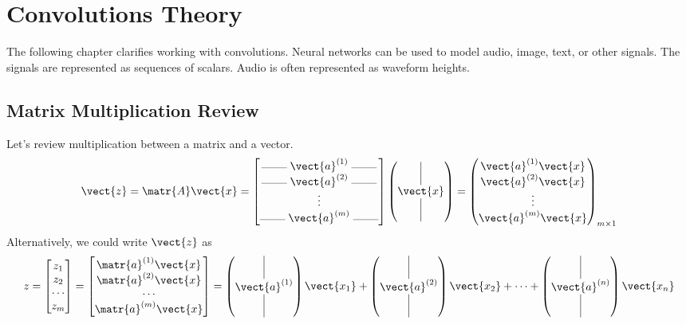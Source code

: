 \chapter{Convolutions Theory}
The following chapter clarifies working with convolutions.
Neural networks can be used to model audio, image, text, or other signals. The signals are represented as sequences of scalars. Audio is often represented as waveform heights. 
\section{Matrix Multiplication Review}
Let's review multiplication between a matrix and a vector.
\[
\vect{z} = {\matr{A}}\vect{x} =
\begin{bmatrix}
    \rule[0.5mm]{0.8cm}{0.1mm} \; {\vect{a}}^{(1)} \; \rule[0.5mm]{0.8cm}{0.1mm} \\
    \rule[0.5mm]{0.8cm}{0.1mm} \; {\vect{a}}^{(2)} \; \rule[0.5mm]{0.8cm}{0.1mm} \\
    \vdots \\
    \rule[0.5mm]{0.8cm}{0.1mm} \; {\vect{a}}^{(m)} \; \rule[0.5mm]{0.8cm}{0.1mm} \\
\end{bmatrix}
\begin{pmatrix}
    \vrule height 0.6cm \\ \vect{x} \\ \vrule height 0.6cm
\end{pmatrix} =
\begin{pmatrix}
    {\vect{a}}^{(1)} \vect{x} \\ {\vect{a}}^{(2)} \vect{x} \\ \vdots \\ {\vect{a}}^{(m)} \vect{x}
\end{pmatrix}_{m \times 1}
\]
Alternatively, we could write $\vect{z}$ as 
\[z = \begin{bmatrix} z_1 \\ z_2 \\ \cdots \\z_m\end{bmatrix} = \begin{bmatrix} \matr{a}^{(1)}\vect{x} \\ \matr{a}^{(2)}\vect{x} \\\cdots \\\matr{a}^{(m)}\vect{x}\end{bmatrix}
= \begin{pmatrix}
    \vrule height 0.6cm \\ \vect{a}^{(1)} \\ \vrule height 0.6cm
\end{pmatrix} \vect{x_1} + \begin{pmatrix}
    \vrule height 0.6cm \\ \vect{a}^{(2)} \\ \vrule height 0.6cm
\end{pmatrix} \vect{x_2}+\cdots+\begin{pmatrix}
    \vrule height 0.6cm \\ \vect{a}^{(n)} \\ \vrule height 0.6cm
\end{pmatrix} \vect{x_n}\]


